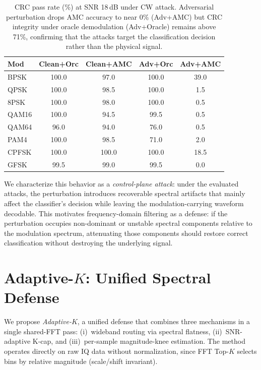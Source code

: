\begin{table}[!ht]
\caption{CRC pass rate (\%) at SNR 18\,dB under CW attack. Adversarial
  perturbation drops AMC accuracy to near 0\% (Adv+AMC) but CRC integrity
  under oracle demodulation (Adv+Oracle) remains above 71\%, confirming
  that the attacks target the classification decision rather than the
  physical signal.}
\label{tab:crc}
\centering
\small
\begin{tabular}{lcccc}
\toprule
Mod & Clean+Orc & Clean+AMC & Adv+Orc & Adv+AMC \\
\midrule
BPSK  & 100.0 & 97.0  & 100.0 & 39.0 \\
QPSK  & 100.0 & 98.5  & 100.0 &  1.5 \\
8PSK  & 100.0 & 98.0  & 100.0 &  0.5 \\
QAM16 & 100.0 & 94.5  &  99.5 &  0.5 \\
QAM64 &  96.0 & 94.0  &  76.0 &  0.5 \\
PAM4  & 100.0 & 98.5  &  71.0 &  2.0 \\
CPFSK & 100.0 & 100.0 & 100.0 & 18.5 \\
GFSK  &  99.5 & 99.0  &  99.5 &  0.0 \\
\bottomrule
\end{tabular}
\end{table}

We characterize this behavior as a \emph{control-plane attack}: under the
evaluated attacks, the perturbation introduces recoverable spectral
artifacts that mainly affect the classifier's decision while leaving the
modulation-carrying waveform decodable. This motivates frequency-domain
filtering as a defense: if the perturbation occupies non-dominant or unstable
spectral components relative to the modulation spectrum, attenuating those
components should restore correct classification without destroying the
underlying signal.

\section{Adaptive-$K$: Unified Spectral Defense}
\label{sec:adaptivek}

We propose \emph{Adaptive-$K$}, a unified defense that combines three
mechanisms in a single shared-FFT pass:
(i)~wideband routing via spectral flatness,
(ii)~SNR-adaptive K-cap, and
(iii)~per-sample magnitude-knee estimation.
The method operates directly on raw IQ data without normalization, since
FFT Top-$K$ selects bins by relative magnitude (scale/shift invariant).


